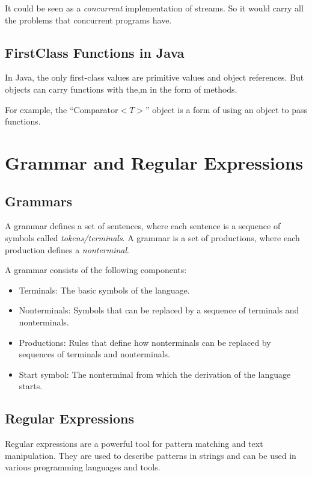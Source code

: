\documentclass[letterpaper,12pt]{article}
\begin{document}
It could be seen as a \textit{concurrent} implementation of streams. So it would carry all the problems that concurrent programs have.
\subsection{First\-Class Functions in Java}

In Java, the only first-class values are primitive values and object references. But objects can carry functions with the,m in the form of methods.

For example, the ``Comparator$<T>$'' object is a form of using an object to pass functions.


\section{Grammar and Regular Expressions}
\subsection{Grammars}
A grammar defines a set of sentences, where each sentence is a sequence of symbols called \textit{tokens/terminals}. A grammar is a set of productions, where each production defines a \textit{nonterminal}.

A grammar consists of the following components:
\begin{itemize}
      \item Terminals: The basic symbols of the language.
      \item Nonterminals: Symbols that can be replaced by a sequence of terminals and nonterminals.
      \item Productions: Rules that define how nonterminals can be replaced by sequences of terminals and nonterminals.
      \item Start symbol: The nonterminal from which the derivation of the language starts.
\end{itemize}

\subsection{Regular Expressions}
Regular expressions are a powerful tool for pattern matching and text manipulation. They are used to describe patterns in strings and can be used in various programming languages and tools.
\end{document}

